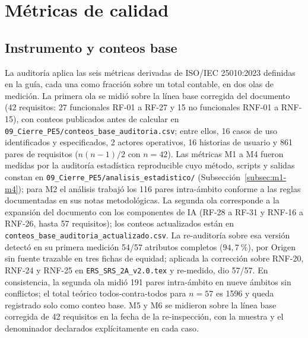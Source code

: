\section{Métricas de calidad}
\label{sec:metricas-calidad}

\subsection{Instrumento y conteos base}
\label{sec:conteos-base}

La auditoría aplica las seis métricas derivadas de ISO/IEC 25010:2023 definidas en la guía, cada una como fracción sobre un total contable, en dos olas de medición. La primera ola se midió sobre la línea base corregida del documento (42 requisitos: 27 funcionales RF-01 a RF-27 y 15 no funcionales RNF-01 a RNF-15), con conteos publicados antes de calcular en \texttt{09\_Cierre\_PE5/conteos\_base\_auditoria.csv}; entre ellos, 16 casos de uso identificados y especificados, 2 actores operativos, 16 historias de usuario y 861 pares de requisitos ($n(n-1)/2$ con $n=42$). Las métricas M1 a M4 fueron medidas por la auditoría estadística reproducible cuyo método, scripts y salidas constan en \texttt{09\_Cierre\_PE5/analisis\_estadistico/} (Subsección~\ref{subsec:m1-m4}); para M2 el análisis trabajó los 116 pares intra-ámbito conforme a las reglas documentadas en sus notas metodológicas. La segunda ola corresponde a la expansión del documento con los componentes de IA (RF-28 a RF-31 y RNF-16 a RNF-26, hasta 57 requisitos); los conteos actualizados están en \texttt{conteos\_base\_auditoria\_actualizado.csv}. La re-auditoría sobre esa versión detectó en su primera medición 54/57 atributos completos ($94{,}7~\%$), por Origen sin fuente trazable en tres fichas de equidad; aplicada la corrección sobre RNF-20, RNF-24 y RNF-25 en \texttt{ERS\_SRS\_2A\_v2.0.tex} y re-medido, dio 57/57. En consistencia, la segunda ola midió 191 pares intra-ámbito en nueve ámbitos sin conflictos; el total teórico todos-contra-todos para $n=57$ es 1596 y queda registrado solo como conteo base. M5 y M6 se midieron sobre la línea base corregida de 42 requisitos en la fecha de la re-inspección, con la muestra y el denominador declarados explícitamente en cada caso.

